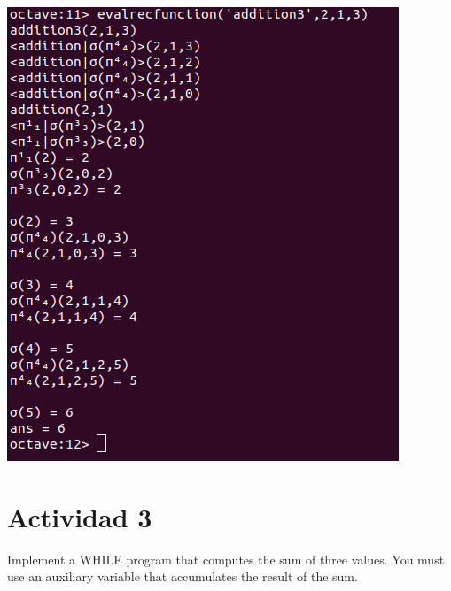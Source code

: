 \documentclass[fleqn, 10pt]{article}
\begin{document}
\includegraphics[scale=0.5]{FuncionR.png}

\newpage

\section*{Actividad 3}
Implement a WHILE program that computes the sum of three values. You
must use an auxiliary variable that accumulates the result of the sum.

\subsection*{}
\end{document}
